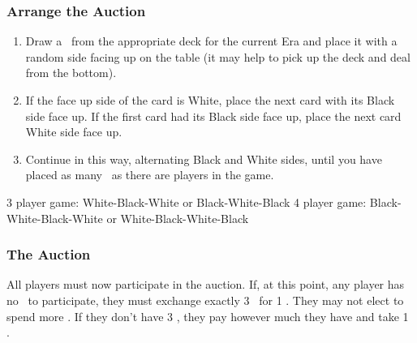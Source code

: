 \documentclass[10pt,twocolumn]{article}
\begin{document}
\subsubsection{Arrange the Auction}
\begin{enumerate}
\item Draw a \landcard\ from the appropriate deck for the current Era and place it with a random side facing up on the table (it may help to pick up the deck and deal from the bottom).
\item If the face up side of the card is White, place the next card with its Black side face up. If the first card had its Black side face up, place the next card White side face up.
\item Continue in this way, alternating Black and White sides, until you have placed as many \landcards\ as there are players in the game.
\iftoggle{original-rules}{}{
\item If playing with 3 players, keep track of the colour the round started with and start the next round with the opposite colour. So if one round comes up White-Black-White, the following round should be Black-White-Black, the round after that White-Black-White again and so on.
}
\end{enumerate}
\begin{BoxExample}3 player game: White-Black-White or Black-White-Black
4 player game: Black-White-Black-White or White-Black-White-Black\end{BoxExample}


\subsubsection{The Auction}
All players must now participate in the auction. If, at this point, any player has no \money\ to participate, they must exchange exactly 3 \vps\ for 1 \money. They may not elect to spend more \vps. If they don't have 3 \vps, they pay however much they have and take 1 \money.
\end{document}
